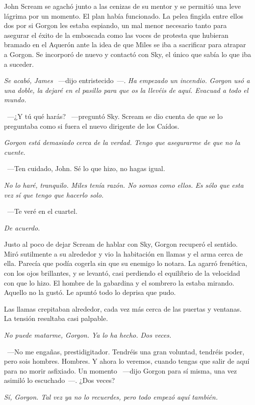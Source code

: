 John Scream se agachó junto a las cenizas de su mentor y se permitió una leve lágrima por un momento. El plan había funcionado. La pelea fingida entre ellos dos por si Gorgon les estaba espiando, un mal menor necesario tanto para asegurar el éxito de la emboscada como las voces de protesta que hubieran bramado en el Aquerón ante la idea de que Miles se iba a sacrificar para atrapar a Gorgon. Se incorporó de nuevo y contactó con Sky, el único que sabía lo que iba a suceder.

\emph{Se acabó, James} ~---dijo entristecido~---. \emph{Ha empezado un incendio. Gorgon usó a una doble, la dejaré en el pasillo para que os la llevéis de aquí. Evacuad a todo el mundo.}

~---¿Y tú qué harás? ~---preguntó Sky. Scream se dio cuenta de que se lo preguntaba como si fuera el nuevo dirigente de los Caídos.

\emph{Gorgon está demasiado cerca de la verdad. Tengo que asegurarme de que no la cuente.}

~---Ten cuidado, John. Sé lo que hizo, no hagas igual.

\emph{No lo haré, tranquilo. Miles tenía razón. No somos como ellos. Es sólo que esta vez sí que tengo que hacerlo solo.}

~---Te veré en el cuartel.

\emph{De acuerdo.}

\bigskip\noindent
Justo al poco de dejar Scream de hablar con Sky, Gorgon recuperó el sentido. Miró sutilmente a su alrededor y vio la habitación en llamas y el arma cerca de ella. Parecía que podía cogerla sin que su enemigo lo notara. La agarró frenética, con los ojos brillantes, y se levantó, casi perdiendo el equilibrio de la velocidad con que lo hizo. El hombre de la gabardina y el sombrero la estaba mirando. Aquello no la gustó. Le apuntó todo lo deprisa que pudo.

Las llamas crepitaban alrededor, cada vez más cerca de las puertas y ventanas. La tensión resultaba casi palpable.

\emph{No puede matarme, Gorgon. Ya lo ha hecho. Dos veces.}

~---No me engañas, prestidigitador. Tendréis una gran voluntad, tendréis poder, pero sois hombres. Hombres. Y ahora lo veremos, cuando tengas que salir de aquí para no morir asfixiado. Un momento ~---dijo Gorgon para sí misma, una vez asimiló lo escuchado~---. ¿Dos veces?

\emph{Sí, Gorgon. Tal vez ya no lo recuerdes, pero todo empezó aquí también.}

